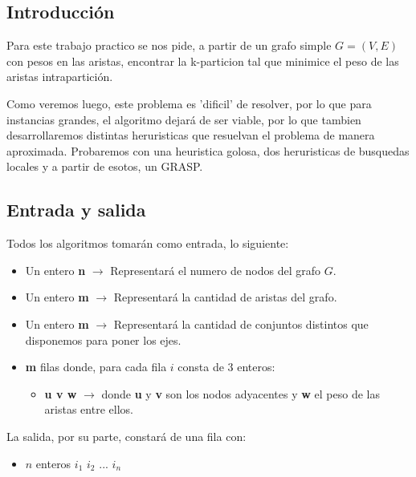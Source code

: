 \subsection{Introducción}

Para este trabajo practico se nos pide, a partir de un grafo simple $G=(V,E)$ con pesos en las aristas, encontrar la k-particion tal que minimice el peso de las aristas intrapartición.

Como veremos luego, este problema es 'dificil' de resolver, por lo que para instancias grandes, el algoritmo dejará de ser viable, por lo que tambien desarrollaremos distintas heruristicas que resuelvan el problema de manera aproximada. Probaremos con una heuristica golosa, dos heruristicas de busquedas locales y a partir de esotos, un GRASP.

\subsection{Entrada y salida}

Todos los algoritmos tomarán como entrada, lo siguiente:

\begin{itemize}
	\item Un entero \textbf{n} $\rightarrow$ Representará el numero de nodos del grafo $G$.

	\item Un entero \textbf{m} $\rightarrow$ Representará la cantidad de aristas del grafo.

	\item Un entero \textbf{m} $\rightarrow$ Representará la cantidad de conjuntos distintos que disponemos para poner los ejes.

	\item \textbf{m} filas donde, para cada fila $i$ consta de $3$ enteros:
	\begin{itemize}
		\item \textbf{u v w} $ \rightarrow $ donde \textbf{u} y \textbf{v} son los nodos adyacentes y \textbf{w} el peso de las aristas entre ellos.
	\end{itemize}
\end{itemize}

La salida, por su parte, constar\'a de una fila con:

\begin{itemize}

\item $n$ enteros $i_1$ $i_2$ $...$ $i_n$

\end{itemize}

